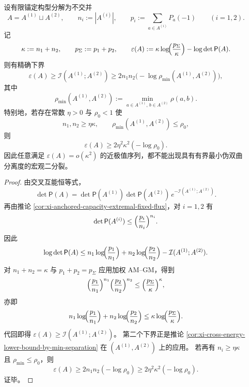 \begin{theorem}[近极值锚定构型的宏观分裂阻断]\label{thm:xi-anchored-near-extremal-macroscopic-split-obstruction}
设有限锚定构型分解为不交并
\[
A=A^{(1)}\sqcup A^{(2)},
\qquad
n_i:=|A^{(i)}|,
\qquad
p_i:=\sum_{a\in A^{(i)}}P_a(-1)
\qquad(i=1,2).
\]
记
\[
\kappa:=n_1+n_2,
\qquad
p_{\Sigma}:=p_1+p_2,
\qquad
\varepsilon(A):=\kappa\log\!\Bigl(\frac{p_{\Sigma}}{\kappa}\Bigr)-\log\det\mathsf P(A).
\]
则有精确下界
\[
\boxed{\;
\varepsilon(A)\ge \mathcal I(A^{(1)};A^{(2)})
\ge
2n_1n_2\bigl(-\log\rho_{\min}(A^{(1)},A^{(2)})\bigr),\;}
\]
其中
\[
\rho_{\min}(A^{(1)},A^{(2)})
:=
\min_{a\in A^{(1)},\,b\in A^{(2)}}\rho(a,b).
\]
特别地，若存在常数 \(\eta>0\) 与 \(\rho_0<1\) 使
\[
n_1,n_2\ge \eta\kappa,
\qquad
\rho_{\min}(A^{(1)},A^{(2)})\le \rho_0,
\]
则
\[
\boxed{\;
\varepsilon(A)\ge 2\eta^2\kappa^2(-\log\rho_0).\;}
\]
因此任意满足 \(\varepsilon(A)=o(\kappa^2)\) 的近极值序列，都不能出现具有有界最小伪双曲分离度的宏观二分裂。
\end{theorem}
\begin{proof}
由交叉互能恒等式，
\[
\det\mathsf P(A)
=
\det\mathsf P(A^{(1)})\det\mathsf P(A^{(2)})\,e^{-\mathcal I(A^{(1)};A^{(2)})}.
\]
再由推论 \ref{cor:xi-anchored-capacity-extremal-fixed-flux}，对 \(i=1,2\) 有
\[
\det\mathsf P(A^{(i)})\le \Bigl(\frac{p_i}{n_i}\Bigr)^{n_i}.
\]
因此
\[
\log\det\mathsf P(A)
\le
n_1\log\!\Bigl(\frac{p_1}{n_1}\Bigr)
+
n_2\log\!\Bigl(\frac{p_2}{n_2}\Bigr)
-
\mathcal I(A^{(1)};A^{(2)}).
\]
对 \(n_1+n_2=\kappa\) 与 \(p_1+p_2=p_{\Sigma}\) 应用加权 AM--GM，得到
\[
\Bigl(\frac{p_1}{n_1}\Bigr)^{n_1}
\Bigl(\frac{p_2}{n_2}\Bigr)^{n_2}
\le
\Bigl(\frac{p_{\Sigma}}{\kappa}\Bigr)^\kappa,
\]
亦即
\[
n_1\log\!\Bigl(\frac{p_1}{n_1}\Bigr)
+
n_2\log\!\Bigl(\frac{p_2}{n_2}\Bigr)
\le
\kappa\log\!\Bigl(\frac{p_{\Sigma}}{\kappa}\Bigr).
\]
代回即得
\(
\varepsilon(A)\ge \mathcal I(A^{(1)};A^{(2)})
\)。
第二个下界正是推论 \ref{cor:xi-cross-energy-lower-bound-by-min-separation} 在 \((A^{(1)},A^{(2)})\) 上的应用。
若再有 \(n_i\ge \eta\kappa\) 且 \(\rho_{\min}\le \rho_0\)，则
\[
\varepsilon(A)
\ge
2n_1n_2(-\log\rho_0)
\ge
2\eta^2\kappa^2(-\log\rho_0).
\]
证毕。
\end{proof}



